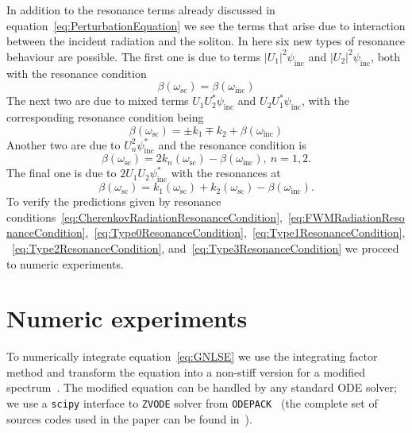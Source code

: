 \documentclass[aps, prl, twocolumn, superscriptaddress, final]{revtex4}
\newcommand{\abs}[1]{\left| #1 \right|}
\begin{document}
In addition to the resonance terms already discussed in equation~\eqref{eq:PerturbationEquation} we see the terms that arise due to interaction between the incident radiation and the soliton. In here six new types of resonance behaviour are possible. The first one is due to terms $\abs{U_{1}}^{2} \psi_{\text{inc}}$ and $\abs{U_{2}}^{2} \psi_{\text{inc}}$, both with the resonance condition
\begin{equation}
  \label{eq:Type0ResonanceCondition}
  \beta(\omega_{\text{sc}}) = \beta(\omega_{\text{inc}})
\end{equation}
The next two are due to mixed terms $U_{1} U_{2}^{*} \psi_{\text{inc}}$ and $U_{2} U_{1}^{*} \psi_{\text{inc}}$, with the corresponding resonance condition being
\begin{equation}
  \label{eq:Type1ResonanceCondition}
  \beta(\omega_{\text{sc}}) = \pm k_{1} \mp k_{2} + \beta(\omega_{\text{inc}})
\end{equation}
Another two are due to $U_{n}^{2} \psi_{\text{inc}}^{*}$ and the resonance condition is
\begin{equation}
  \label{eq:Type2ResonanceCondition}
  \beta(\omega_{\text{sc}}) =
    2 k_{n}(\omega_{\text{sc}}) -
    \beta(\omega_{\text{inc}}), ~ n = 1, 2.
\end{equation}
The final one is due to $2 U_{1} U_{2} \psi_{\text{inc}}^{*}$ with the resonances at
\begin{equation}
  \label{eq:Type3ResonanceCondition}
  \beta(\omega_{\text{sc}}) =
    k_{1}(\omega_{\text{sc}}) +
    k_{2}(\omega_{\text{sc}}) -
    \beta(\omega_{\text{inc}}).
\end{equation}
To verify the predictions given by resonance conditions~\eqref{eq:CherenkovRadiationResonanceCondition},~\eqref{eq:FWMRadiationResonanceCondition},~\eqref{eq:Type0ResonanceCondition},~\eqref{eq:Type1ResonanceCondition},~\eqref{eq:Type2ResonanceCondition}, and~\eqref{eq:Type3ResonanceCondition} we proceed to numeric experiments.

\section{Numeric experiments}%
\label{sec:NumericExperiments}

To numerically integrate equation~\eqref{eq:GNLSE} we use the integrating factor method and transform the equation into a non-stiff version for a modified spectrum~\cite{dudley2010supercontinuum}. The modified equation can be handled by any standard ODE solver; we use a \texttt{scipy} interface to \texttt{ZVODE} solver from \texttt{ODEPACK}~\cite{hindmarsh1983odepack, virtanen2020scipy} (the complete set of sources codes used in the paper can be found in~\cite{sources}).
\end{document}
